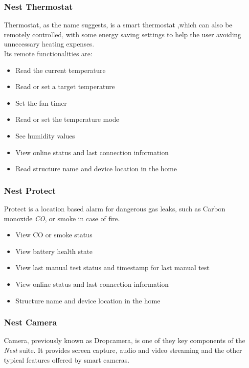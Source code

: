 \subsubsection{Nest Thermostat}
Thermostat, as the name suggests, is a smart thermostat ,which can also be remotely controlled,
with some energy saving settings to help the user avoiding unnecessary heating expenses.   \\
Its remote functionalities are:

\begin{itemize}
    \item Read the current temperature
    \item Read or set a target temperature
    \item Set the fan timer
    \item Read or set the temperature mode
    \item See humidity values
    \item View online status and last connection information
    \item Read structure name and device location in the home
\end{itemize}

\subsubsection{Nest Protect}
Protect is a location based alarm for dangerous gas leaks, such as  Carbon monoxide \textit{CO}, or
smoke in case of fire.

\begin{itemize}
    \item View CO or smoke status
    \item View battery health state
    \item View last manual test status and timestamp for last manual test
    \item View online status and last connection information
    \item Structure name and device location in the home
\end{itemize}

\subsubsection{Nest Camera}
Camera, previously known as Dropcamera, is one of they key components of the
\textit{Nest} suite. It provides screen capture, audio and video streaming and the
other typical features offered by smart cameras.

